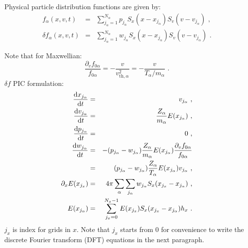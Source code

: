 \documentclass[12pt]{article}
\begin{document}
Physical particle distribution functions are given by:
\begin{eqnarray}
	f_\alpha(x, v, t) & = & \sum_{j_\alpha = 1}^{N_\alpha} p_{j_\alpha} S_x(x - x_{j_\alpha}) S_v(v - v_{j_\alpha}) \textrm{ ,} \\
	\delta f_\alpha(x, v, t) & = & \sum_{j_\alpha = 1}^{N_\alpha} w_{j_\alpha} S_x(x - x_{j_\alpha}) S_v(v - v_{j_\alpha}) \textrm{ .}
\end{eqnarray}

Note that for Maxwellian:
\begin{equation}
	\frac{\partial_v f_{0 \alpha}}{f_{0 \alpha}} = - \frac{v}{v_{\mathrm{th}, \alpha}^2} = - \frac{v}{T_\alpha / m_\alpha} \textrm{ .}
\end{equation}
$\delta f$ PIC formulation:
\begin{eqnarray}
	\frac{\mathrm{d} x_{j_\alpha}}{\mathrm{d} t} & = & v_{j_\alpha} \textrm{ ,} \label{eq:particle_evolution_begin} \\
	\frac{\mathrm{d} v_{j_\alpha}}{\mathrm{d} t} & = & \frac{Z_\alpha}{m_\alpha} E(x_{j_\alpha}) \textrm{ ,} \\
	\frac{\mathrm{d} p_{j_\alpha}}{\mathrm{d} t} & = & 0 \textrm{ ,} \\
	\frac{\mathrm{d} w_{j_\alpha}}{\mathrm{d} t} & = & - (p_{j_\alpha} - w_{j_\alpha}) \frac{Z_\alpha}{m_\alpha} E(x_{j_\alpha}) \frac{\partial_v f_{0 \alpha}}{f_{0 \alpha}} \nonumber \\
	& = & (p_{j_\alpha} - w_{j_\alpha}) \frac{Z_\alpha}{T_\alpha} E(x_{j_\alpha}) v_{j_\alpha} \textrm{ ,} \label{eq:particle_evolution_end} \\
	\partial_x E(x_{j_x}) & = & 4 \pi \sum_\alpha \sum_{j_\alpha} w_{j_\alpha} S_x(x_{j_x} - x_{j_\alpha}) \textrm{ ,} \label{eq:poisson_df_pic} \\
	E(x_{j_\alpha}) & = & \sum_{j_x = 0}^{N_x - 1} E(x_{j_x}) S_x(x_{j_x} - x_{j_\alpha}) h_x \textrm{ .} \label{eq:field_scatter}
\end{eqnarray}
$j_x$ is index for grids in $x$.
Note that $j_x$ starts from $0$ for convenience to write the discrete Fourier transform (DFT) equations in the next paragraph.
\end{document}
